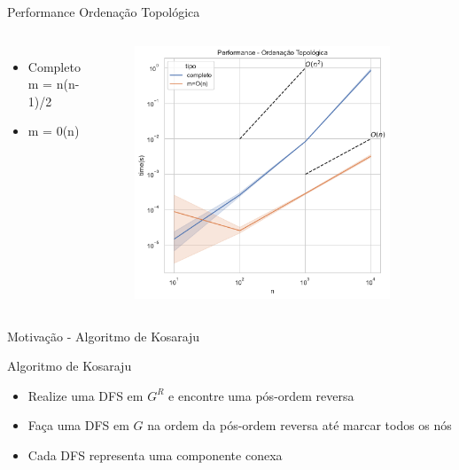 \documentclass[aspectratio=169,usenames,dvipsnames]{beamer}
\begin{document}
\begin{frame}{Performance Ordenação Topológica}
  \begin{columns}
    
    \begin{itemize}
      \item Completo m = n(n-1)/2 
      \item m = 0(n)
    \end{itemize}


    \begin{figure}[ht]
    \centering
    \includegraphics[width=0.9\textwidth]{figs/topological_order_time.pdf}
    \end{figure}

  \end{columns}
\end{frame}



\begin{frame}{Motivação - Algoritmo de Kosaraju}




  
\end{frame}


\begin{frame}{Algoritmo de Kosaraju}

  \begin{itemize}
    \item Realize uma DFS em $G^{R}$ e encontre uma pós-ordem reversa
    \item Faça uma DFS em $G$ na ordem da pós-ordem reversa até marcar todos os nós
    \item Cada DFS representa uma componente conexa
  \end{itemize}

\end{frame}
\end{document}
